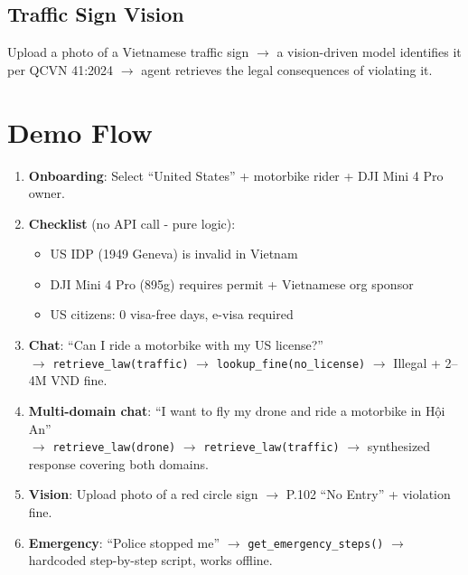 \documentclass[conference, onecolumn]{IEEEtran}
\begin{document}
\subsection{Traffic Sign Vision}

Upload a photo of a Vietnamese traffic sign $\rightarrow$ a vision-driven model identifies it per QCVN 41:2024 $\rightarrow$ agent retrieves the legal consequences of violating it.

\section{Demo Flow}
\label{sec:demo}

\begin{enumerate}[leftmargin=*]
    \item \textbf{Onboarding}: Select ``United States'' + motorbike rider + DJI Mini 4 Pro owner.

    \item \textbf{Checklist} (no API call - pure logic):
    \begin{itemize}
        \item[$\times$] US IDP (1949 Geneva) is invalid in Vietnam
        \item[$\times$] DJI Mini 4 Pro (895g) requires permit + Vietnamese org sponsor
        \item[$\times$] US citizens: 0 visa-free days, e-visa required
    \end{itemize}

    \item \textbf{Chat}: ``Can I ride a motorbike with my US license?''\\
    $\rightarrow$ \texttt{retrieve\_law(traffic)} $\rightarrow$ \texttt{lookup\_fine(no\_license)} $\rightarrow$ Illegal + 2--4M VND fine.

    \item \textbf{Multi-domain chat}: ``I want to fly my drone and ride a motorbike in Hội An''\\
    $\rightarrow$ \texttt{retrieve\_law(drone)} $\rightarrow$ \texttt{retrieve\_law(traffic)} $\rightarrow$ synthesized response covering both domains.

    \item \textbf{Vision}: Upload photo of a red circle sign $\rightarrow$ P.102 ``No Entry'' + violation fine.

    \item \textbf{Emergency}: ``Police stopped me'' $\rightarrow$ \texttt{get\_emergency\_steps()} $\rightarrow$ hardcoded step-by-step script, works offline.
\end{enumerate}
\end{document}

